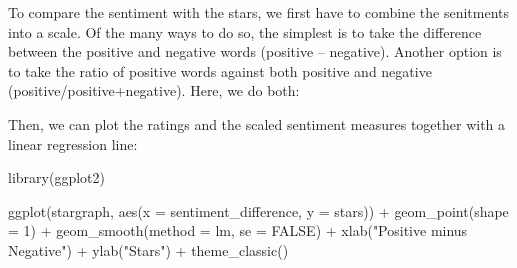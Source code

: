 \documentclass[
]{book}
\newenvironment{Shaded}{\begin{snugshade}}{\end{snugshade}}
\newcommand{\AttributeTok}[1]{\textcolor[rgb]{0.77,0.63,0.00}{#1}}
\newcommand{\ConstantTok}[1]{\textcolor[rgb]{0.00,0.00,0.00}{#1}}
\newcommand{\DecValTok}[1]{\textcolor[rgb]{0.00,0.00,0.81}{#1}}
\newcommand{\FunctionTok}[1]{\textcolor[rgb]{0.00,0.00,0.00}{#1}}
\newcommand{\NormalTok}[1]{#1}
\newcommand{\OtherTok}[1]{\textcolor[rgb]{0.56,0.35,0.01}{#1}}
\newcommand{\SpecialCharTok}[1]{\textcolor[rgb]{0.00,0.00,0.00}{#1}}
\newcommand{\StringTok}[1]{\textcolor[rgb]{0.31,0.60,0.02}{#1}}
\begin{document}
\begin{Shaded}
\end{Shaded}

To compare the sentiment with the stars, we first have to combine the senitments into a scale. Of the many ways to do so, the simplest is to take the difference between the positive and negative words (positive -- negative). Another option is to take the ratio of positive words against both positive and negative (positive/positive+negative). Here, we do both:

\begin{Shaded}
\end{Shaded}

Then, we can plot the ratings and the scaled sentiment measures together with a linear regression line:

\begin{Shaded}
\begin{Highlighting}[]
\FunctionTok{library}\NormalTok{(ggplot2)}

\FunctionTok{ggplot}\NormalTok{(stargraph, }\FunctionTok{aes}\NormalTok{(}\AttributeTok{x =}\NormalTok{ sentiment\_difference, }\AttributeTok{y =}\NormalTok{ stars)) }\SpecialCharTok{+}
    \FunctionTok{geom\_point}\NormalTok{(}\AttributeTok{shape =} \DecValTok{1}\NormalTok{) }\SpecialCharTok{+} \FunctionTok{geom\_smooth}\NormalTok{(}\AttributeTok{method =}\NormalTok{ lm, }\AttributeTok{se =} \ConstantTok{FALSE}\NormalTok{) }\SpecialCharTok{+}
    \FunctionTok{xlab}\NormalTok{(}\StringTok{"Positive minus Negative"}\NormalTok{) }\SpecialCharTok{+} \FunctionTok{ylab}\NormalTok{(}\StringTok{"Stars"}\NormalTok{) }\SpecialCharTok{+} \FunctionTok{theme\_classic}\NormalTok{()}
\end{Highlighting}
\end{Shaded}
\end{document}

